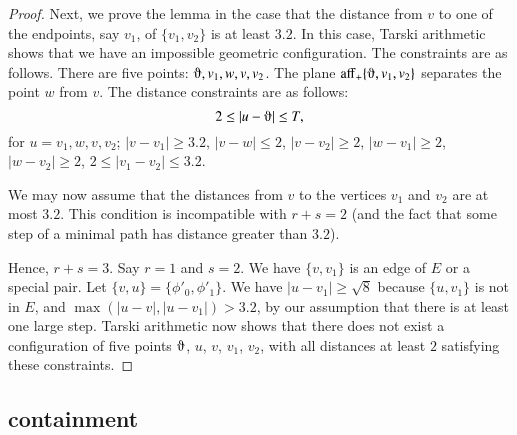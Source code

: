 \begin{proof}
Next, we prove the lemma in the case that the distance from
$v$ to one of the endpoints, say $v_1$, of $\{v_1,v_2\}$ is at least
$3.2$. In this case, Tarski arithmetic shows
that we have an
impossible geometric configuration. The
constraints are as follows.  There are five points: $\orgn,v_1,w,v,v_2$.
The plane $\op{aff}_+\{\orgn,v_1,v_2\}$ separates the point $w$ from $v$. The
distance constraints are as follows:
    $$2\le |u-\orgn| \le T,$$
for $u=v_1,w,v,v_2$; $|v-v_1|\ge 3.2$, $|v-w|\le2$, $|v-v_2|\ge2$,
$|w-v_1|\ge2$, $|w-v_2|\ge2$, $2\le |v_1-v_2|\le 3.2$.

We may now assume that the distances from $v$ to the vertices $v_1$ and
$v_2$ are at most $3.2$.  This condition is incompatible with $r+s=2$
(and the fact that some step of a minimal path has distance greater than 
$3.2$).  

Hence, $r+s=3$.
Say $r=1$ and $s=2$. We have $\{v,v_1\}$ is
an edge of $E$ or a special pair.  Let
$\{v,u\}=\{\phi'_0,\phi'_1\}$. We
have $|u-v_1|\ge\sqrt8$ because $\{u,v_1\}$ is not in $E$,
and $\max(|u-v|,|u-v_1|)>3.2$, by our assumption that there is at least
one large step.  Tarski arithmetic now shows that
there does not exist a configuration of five points
$\orgn$, $u$, $v$, $v_1$, $v_2$, with all distances at least $2$
satisfying these constraints.
\end{proof}



\subsection{containment} %

